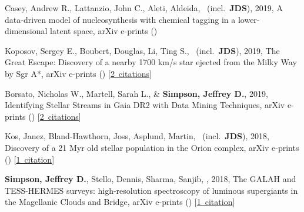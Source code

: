 \item[{\color{numcolor}\scriptsize5}] Casey, Andrew R., Lattanzio, John C., Aleti, Aldeida, \etal\ (incl.\ \textbf{JDS}), 2019, A data-driven model of nucleosynthesis with chemical tagging in a lower-dimensional latent space, arXiv e-prints ()

\item[{\color{numcolor}\scriptsize4}] Koposov, Sergey E., Boubert, Douglas, Li, Ting S., \etal\ (incl.\ \textbf{JDS}), 2019, The Great Escape: Discovery of a nearby 1700 km/s star ejected from the Milky Way by Sgr A*, arXiv e-prints () [\href{https://ui.adsabs.harvard.edu/#abs/2019arXiv190711725K}{2~citations}]

\item[{\color{numcolor}\scriptsize3}] Borsato, Nicholas W., Martell, Sarah L., \& \textbf{Simpson, Jeffrey D.}, 2019, Identifying Stellar Streams in Gaia DR2 with Data Mining Techniques, arXiv e-prints () [\href{https://ui.adsabs.harvard.edu/#abs/2019arXiv190702527B}{2~citations}]

\item[{\color{numcolor}\scriptsize2}] Kos, Janez, Bland-Hawthorn, Joss, Asplund, Martin, \etal\ (incl.\ \textbf{JDS}), 2018, Discovery of a 21 Myr old stellar population in the Orion complex, arXiv e-prints () [\href{https://ui.adsabs.harvard.edu/#abs/2018arXiv181111762K}{1~citation}]

\item[{\color{numcolor}\scriptsize1}] \textbf{Simpson, Jeffrey D.}, Stello, Dennis, Sharma, Sanjib, \etal, 2018, The GALAH and TESS-HERMES surveys: high-resolution spectroscopy of luminous supergiants in the Magellanic Clouds and Bridge, arXiv e-prints () [\href{https://ui.adsabs.harvard.edu/#abs/2018arXiv180405900S}{1~citation}]